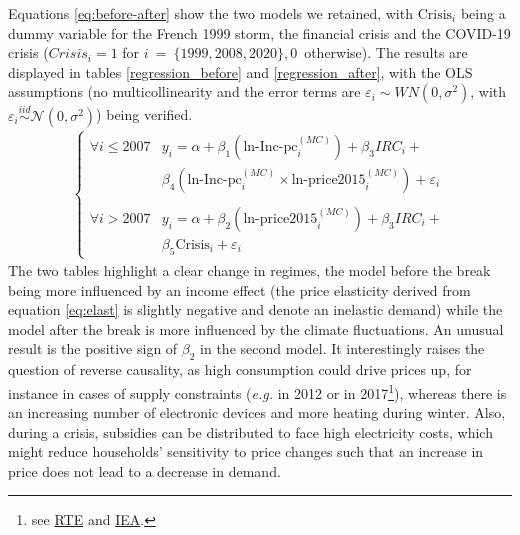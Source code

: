 Equations \eqref{eq:before-after} show the two models we retained, with $\text{Crisis}_i$ being a dummy variable for the French 1999 storm, the financial crisis and the COVID-19 crisis (${Crisis}_i = 1$ for $i~=~\{1999, 2008, 2020\}, 0$~otherwise). The results are displayed in tables \ref{regression_before} and \ref{regression_after}, with the OLS assumptions (no multicollinearity and the error terms are $\varepsilon_i \sim WN(0, \sigma^2)$, {with} $\varepsilon_i \overset{iid}{\sim} \mathcal{N}(0, \sigma^2)$) being verified.
\begin{align} \label{eq:before-after}
    \begin{cases}
        \forall i \leq 2007 & y_i = \alpha + \beta_1 \left(\text{ln-Inc-pc}_i^{(MC)}\right) + \beta_3 IRC_i + \\ & \beta_4 \left(\text{ln-Inc-pc}_i^{(MC)} \times \text{ln-price2015}_i^{(MC)}\right) + \varepsilon_i \\
        \\
        \forall i > 2007 & y_i = \alpha + \beta_2 \left(\text{ln-price2015}_i^{(MC)}\right) + \beta_3 IRC_i + \\ & \beta_5 \text{Crisis}_i + \varepsilon_i
    \end{cases} 
\end{align}
The two tables highlight a clear change in regimes, the model before the break being more influenced by an income effect (the price elasticity derived from equation \eqref{eq:elast} is slightly negative and denote an inelastic demand) while the model after the break is more influenced by the climate fluctuations. An unusual result is the positive sign of $\beta_2$ in the second model. It interestingly raises the question of reverse causality, as high consumption could drive prices up, for instance in cases of supply constraints (\textit{e.g.} in 2012 or in 2017\footnote{see \href{http://publications.elia.be/upload/UG_upload/5SQMH9Z4FF.pdf}{RTE} and \href{https://www.nucnet.org/news/as-france-faces-winter-supply-constraints-iea-says-renewables-cannot-replace-nuclear}{IEA}.}), whereas there is an increasing number of electronic devices and more heating during winter. Also, during a crisis, subsidies can be distributed to face high electricity costs, which might reduce households' sensitivity to price changes such that an increase in price does not lead to a decrease in demand.

